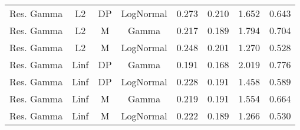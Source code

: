 \begin{tabular}{cccccccc}
Res. Gamma & L2 & DP & LogNormal & 0.273 & 0.210 & 1.652 & 0.643\\
Res. Gamma & L2 & M & Gamma & 0.217 & 0.189 & 1.794 & 0.704\\
Res. Gamma & L2 & M & LogNormal & 0.248 & 0.201 & 1.270 & 0.528\\
\addlinespace
Res. Gamma & Linf & DP & Gamma & 0.191 & 0.168 & 2.019 & 0.776\\
Res. Gamma & Linf & DP & LogNormal & 0.228 & 0.191 & 1.458 & 0.589\\
Res. Gamma & Linf & M & Gamma & 0.219 & 0.191 & 1.554 & 0.664\\
Res. Gamma & Linf & M & LogNormal & 0.222 & 0.189 & 1.266 & 0.530\\
\bottomrule
\end{tabular}
